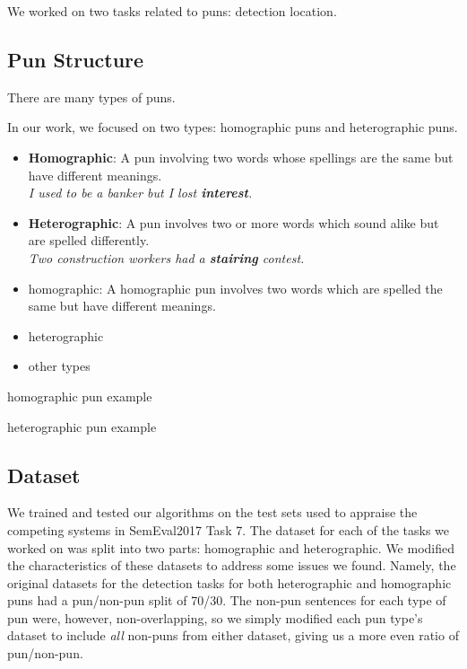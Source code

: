 \documentclass{article}
\begin{document}
We worked on two tasks related to puns: detection location.

\subsection{Pun Structure}

There are many types of puns.

In our work, we focused on two types: homographic puns and heterographic puns. 
\begin{itemize}
	\item {\textbf{Homographic}: A pun involving two words whose spellings are
		the same but have different meanings.\\ \textit{I used to be a banker
		but I lost \textbf{interest}.}}
	\item {\textbf{Heterographic}: A pun involves two or more words which sound
		alike but are spelled differently.\\ \textit{Two construction workers
		had a \textbf{stairing} contest.}}
\end{itemize}

\begin{itemize}

\item homographic: 
A homographic pun involves two words which are spelled the same but have
different meanings.

\item heterographic
\item other types

\end{itemize}

\begin{center}

	homographic pun example
\end{center}

\begin{center}
	heterographic pun example
\end{center}


\subsection{Dataset}

We trained and tested our algorithms on the test sets used to appraise the
competing systems in SemEval2017 Task 7. The dataset for each of the tasks we
worked on was split into two parts: homographic and heterographic. We modified
the characteristics of these datasets to address some issues we found. Namely,
the original datasets for the detection tasks for both heterographic and
homographic puns had a pun/non-pun split of 70/30. The non-pun sentences for
each type of pun were, however, non-overlapping, so we simply modified each pun
type's dataset to include \emph{all} non-puns from either dataset, giving us a
more even ratio of pun/non-pun.
\end{document}
